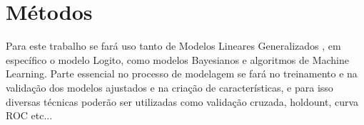 \documentclass[
12pt,				%
openright,			%
oneside,			%
a4paper,			%
english,			%
brazil,				%
]{abntex2}
\begin{document}
\section{Métodos}
\label{sec:metodos}

Para este trabalho se fará uso tanto de Modelos Lineares Generalizados \cite{nelder1972generalized}, em
específico o modelo Logito, como modelos Bayesianos e algoritmos de Machine
Learning. Parte essencial no processo de modelagem se fará no treinamento e na
validação dos modelos ajustados e na criação de características, e para isso
diversas técnicas poderão ser utilizadas como validação cruzada, holdount, curva
ROC etc...



%
\end{document}

